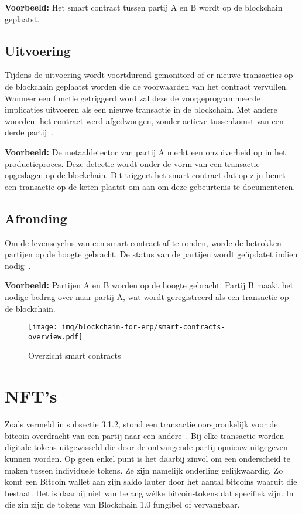 \textbf{Voorbeeld:}
Het smart contract tussen partij A en B wordt op de blockchain geplaatst.

\subsection{Uitvoering}

Tijdens de uitvoering wordt voortdurend gemonitord of er nieuwe transacties op de blockchain geplaatst worden die de voorwaarden van het contract vervullen. Wanneer een functie getriggerd word zal deze de voorgeprogrammeerde implicaties uitvoeren als een nieuwe transactie in de blockchain. Met andere woorden: het contract werd afgedwongen, zonder actieve tussenkomst van een derde partij~\autocite{Delmolino2016}.

\textbf{Voorbeeld:}
De metaaldetector van partij A merkt een onzuiverheid op in het productieproces. Deze detectie wordt onder de vorm van een transactie opgeslagen op de blockchain. Dit triggert het smart contract dat op zijn beurt een transactie op de keten plaatst om aan om deze gebeurtenis te documenteren.

\subsection{Afronding}

Om de levenscyclus van een smart contract af te ronden, worde de betrokken partijen op de hoogte gebracht. De status van de partijen wordt geüpdatet indien nodig~\autocite{Zheng2019}.

\textbf{Voorbeeld:}
Partijen A en B worden op de hoogte gebracht. Partij B maakt het nodige bedrag over naar partij A, wat wordt geregistreerd als een transactie op de blockchain.

\begin{figure}[H]
	\centering
	\texttt{[image: img/blockchain-for-erp/smart-contracts-overview.pdf]}
	\caption{\label{fig:smart-contracts-overview}Overzicht smart contracts~\autocite{Zheng2019}}
\end{figure}

\section{NFT's}

Zoals vermeld in subsectie 3.1.2, stond een transactie oorspronkelijk voor de bitcoin-overdracht van een partij naar een andere~\autocite{Pierro2017}. Bij elke transactie worden digitale tokens uitgewisseld die door de ontvangende partij opnieuw uitgegeven kunnen worden. Op geen enkel punt is het daarbij zinvol om een onderscheid te maken tussen individuele tokens. Ze zijn namelijk onderling gelijkwaardig. Zo komt een Bitcoin wallet aan zijn saldo lauter door het aantal bitcoins waaruit die bestaat. Het is daarbij niet van belang wélke bitcoin-tokens dat specifiek zijn. In die zin zijn de tokens van Blockchain 1.0 fungibel of vervangbaar.

